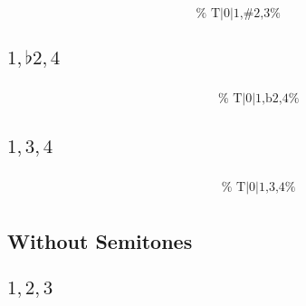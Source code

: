 \documentclass[english]{./gbook}
\begin{document}
\begin{large}
\[\begin{array}{ll}
&
	\text{
	}
\end{array}
\]


\subsection*{$1,\flat2,4$}
\[
\begin{array}{ll}
	\begin{array}{c}
		\begin{array}{ccc}
			&%
			&%
		\end{array}
		\\
		\begin{array}{cc}
			&%
		\end{array}
	\end{array}

&
	\text{
	}
\end{array}
\]

\subsection*{$1,3,4$}
\[
\begin{array}{ll}
	\begin{array}{c}
		\begin{array}{ccc}
			&%
			&%
		\end{array}
		\\
		\begin{array}{cc}
			&%
		\end{array}
	\end{array}

&
	\text{
	}
\end{array}
\]

\subsection*{Without Semitones}

\subsection*{$1,2,3$}
\[
\begin{array}{ll}
	\begin{array}{c}
		\begin{array}{ccc}
			&%
			&%
		\end{array}
		\\
		\begin{array}{cc}
			&%
		\end{array}
	\end{array}


\end{array}\]
\end{large}
\end{document}

